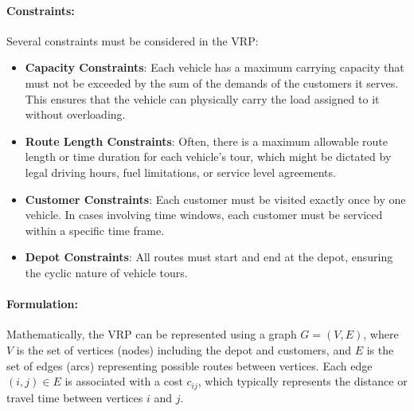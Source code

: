 \documentclass[
]{article}
\begin{document}
\paragraph{Constraints:}
Several constraints must be considered in the VRP:
\begin{itemize}
  \item \textbf{Capacity Constraints}: Each vehicle has a maximum carrying capacity that must not be exceeded by the sum of the demands of the customers it serves. This ensures that the vehicle can physically carry the load assigned to it without overloading.
  \item \textbf{Route Length Constraints}: Often, there is a maximum allowable route length or time duration for each vehicle's tour, which might be dictated by legal driving hours, fuel limitations, or service level agreements.
  \item \textbf{Customer Constraints}: Each customer must be visited exactly once by one vehicle. In cases involving time windows, each customer must be serviced within a specific time frame.
  \item \textbf{Depot Constraints}: All routes must start and end at the depot, ensuring the cyclic nature of vehicle tours.
\end{itemize}

\paragraph{Formulation:}
Mathematically, the VRP can be represented using a graph \( G = (V, E) \), where \( V \) is the set of vertices (nodes) including the depot and customers, and \( E \) is the set of edges (arcs) representing possible routes between vertices. Each edge \( (i, j) \in E \) is associated with a cost \( c_{ij} \), which typically represents the distance or travel time between vertices \( i \) and \( j \).
\end{document}
